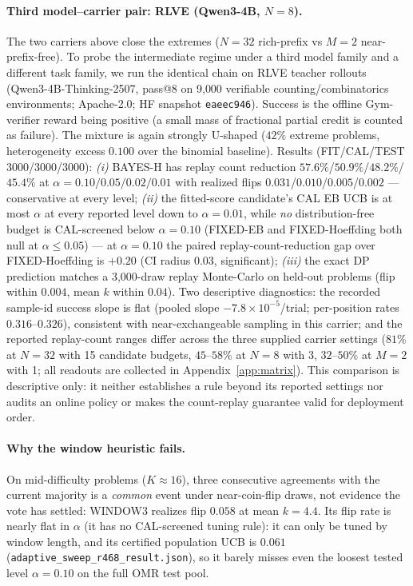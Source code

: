 \documentclass{article}
\theoremstyle{definition}
\theoremstyle{remark}
\begin{document}
\paragraph{Third model--carrier pair: RLVE (Qwen3-4B, $N=8$).} The two
carriers above close the extremes ($N{=}32$ rich-prefix vs $M{=}2$
near-prefix-free). To probe the intermediate regime under a third model
family and a different task family, we run the identical chain on RLVE
teacher rollouts (Qwen3-4B-Thinking-2507, pass@8 on 9{,}000 verifiable
counting/combinatorics environments; Apache-2.0; HF snapshot
\texttt{eaeec946}). Success is the offline Gym-verifier reward being positive
(a small mass of fractional partial credit is counted as failure). The
mixture is again strongly U-shaped ($42\%$ extreme problems, heterogeneity
excess $0.100$ over the binomial baseline). Results (FIT/CAL/TEST
3000/3000/3000): \emph{(i)} BAYES-H has replay count reduction $57.6\%$/$50.9\%$/$48.2\%$/$45.4\%$
at $\alpha=0.10/0.05/0.02/0.01$ with realized flips
$0.031$/$0.010$/$0.005$/$0.002$ --- conservative at every level;
\emph{(ii)} the fitted-score candidate's CAL EB UCB is at most $\alpha$ at
every reported level down to $\alpha=0.01$, while \emph{no} distribution-free
budget is CAL-screened below
$\alpha=0.10$ (FIXED-EB and FIXED-Hoeffding both null at
$\alpha\le0.05$) --- at $\alpha=0.10$ the paired replay-count-reduction gap over
FIXED-Hoeffding is $+0.20$ (CI radius $0.03$, significant); \emph{(iii)} the
exact DP prediction matches a 3{,}000-draw replay Monte-Carlo on held-out
problems (flip within $0.004$, mean $k$ within $0.04$). Two descriptive
diagnostics: the recorded sample-id success slope is flat
(pooled slope $-7.8\times10^{-5}$/trial; per-position rates $0.316$--$0.326$),
consistent with near-exchangeable sampling in this carrier; and the reported
replay-count ranges differ across the three supplied carrier settings
($81\%$ at $N{=}32$ with 15 candidate budgets, $45$--$58\%$ at $N{=}8$ with
3, $32$--$50\%$ at $M{=}2$ with 1; all readouts are collected in
Appendix~\ref{app:matrix}). This comparison is descriptive only: it neither
establishes a rule beyond its reported settings nor audits an online policy or
makes the count-replay guarantee valid for deployment order.

\paragraph{Why the window heuristic fails.} On mid-difficulty problems
($K\approx16$), three consecutive agreements with the current majority is a
\emph{common} event under near-coin-flip draws, not evidence the vote has
settled: WINDOW3 realizes flip $0.058$ at mean $k=4.4$. Its flip rate is
nearly flat in $\alpha$ (it has no CAL-screened tuning rule): it can only be tuned by
window length, and its certified population UCB is $0.061$
(\texttt{adaptive\_sweep\_r468\_result.json}), so it barely misses even the
loosest tested level $\alpha=0.10$ on the full OMR test pool.
\end{document}
